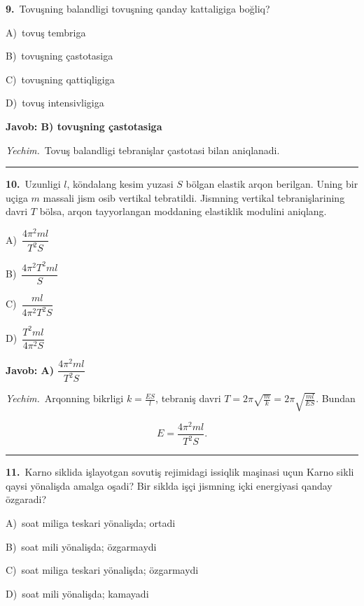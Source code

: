 \documentclass[11pt,a4paper]{article}
\newcommand{\opt}[2]{\hspace*{4mm}#1)\ #2\par}
\begin{document}
\noindent\begin{minipage}{\linewidth}
\textbf{9.}\ Tovuşning balandligi tovuşning qanday kattaligiga boğliq?\par\smallskip
\opt{A}{tovuş tembriga}
\opt{B}{tovuşning çastotasiga}
\opt{C}{tovuşning qattiqligiga}
\opt{D}{tovuş intensivligiga}
\end{minipage}\vspace{2pt}\par
\noindent\colorbox{gray!12}{\parbox{\dimexpr\linewidth-2\fboxsep}{\textbf{Javob: B) tovuşning çastotasiga}}}\par\smallskip
\noindent\textit{Yechim.}\ Tovuş balandligi tebranişlar çastotasi bilan aniqlanadi.\par\par\medskip\hrule\medskip
{}\noindent\begin{minipage}{\linewidth}
\textbf{10.}\ Uzunligi $l$, köndalang kesim yuzasi $S$ bölgan elastik arqon berilgan. Uning bir uçiga $m$ massali jism osib vertikal tebratildi. Jismning vertikal tebranişlarining davri $T$ bölsa, arqon tayyorlangan moddaning elastiklik modulini aniqlang.\par\smallskip
\opt{A}{$\dfrac{4\pi^2ml}{T^2S}$}
\opt{B}{$\dfrac{4\pi^2T^2ml}{S}$}
\opt{C}{$\dfrac{ml}{4\pi^2T^2S}$}
\opt{D}{$\dfrac{T^2ml}{4\pi^2S}$}
\end{minipage}\vspace{2pt}\par
\noindent\colorbox{gray!12}{\parbox{\dimexpr\linewidth-2\fboxsep}{\textbf{Javob: A) $\dfrac{4\pi^2ml}{T^2S}$}}}\par\smallskip
\noindent\textit{Yechim.}\ Arqonning bikrligi $k=\frac{ES}{l}$, tebraniş davri $T=2\pi\sqrt{\frac{m}{k}}=2\pi\sqrt{\frac{ml}{ES}}$. Bundan\par
\[E=\frac{4\pi^2ml}{T^2S}.\]\par\medskip\hrule\medskip
{}\noindent\begin{minipage}{\linewidth}
\textbf{11.}\ Karno siklida işlayotgan sovutiş rejimidagi issiqlik maşinasi uçun Karno sikli qaysi yönalişda amalga oşadi? Bir siklda işçi jismning içki energiyasi qanday özgaradi?\par\smallskip
\opt{A}{soat miliga teskari yönalişda; ortadi}
\opt{B}{soat mili yönalişda; özgarmaydi}
\opt{C}{soat miliga teskari yönalişda; özgarmaydi}
\opt{D}{soat mili yönalişda; kamayadi}
\end{minipage}\vspace{2pt}\par
\end{document}
